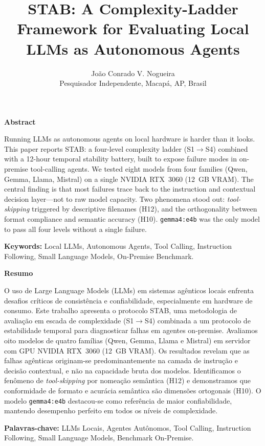 \documentclass{kdmile}
\title{STAB: A Complexity-Ladder Framework for Evaluating Local LLMs as Autonomous Agents}
\author{
  João Conrado V. Nogueira\\
  {\small Pesquisador Independente, Macapá, AP, Brasil}
}
\newenvironment{abstracten}{%
  \vspace{4pt}\begin{center}\normalsize\bfseries Abstract\end{center}%
  \noindent\small\ignorespaces
}{\normalsize\vspace{4pt}}
\newenvironment{resumo}{%
  \vspace{4pt}\begin{center}\normalsize\bfseries Resumo\end{center}%
  \noindent\small\ignorespaces
}{\normalsize\vspace{4pt}}
\begin{document}
\maketitle
\gdef\@runningfoot{\@journalName, KDMiLe 2026.}
\gdef\@firstfoot{\@journalName, KDMiLe 2026.}

\begin{abstracten}
Running LLMs as autonomous agents on local hardware is harder than it looks.
%
This paper reports STAB: a four-level complexity ladder (S1$\rightarrow$S4)
combined with a 12-hour temporal stability battery, built to expose
failure modes in on-premise tool-calling agents.
%
We tested eight models from four families (Qwen, Gemma, Llama, Mistral)
on a single NVIDIA RTX~3060 (12~GB VRAM).
%
The central finding is that most failures trace back to the instruction and
contextual decision layer—\allowbreak not to raw model capacity.
%
Two phenomena stood out: \emph{tool-skipping} triggered by descriptive
filenames (H12), and the orthogonality between format compliance and semantic
accuracy (H10).
%
\texttt{gemma4:e4b} was the only model to pass all four levels without a
single failure.

\textbf{Keywords:} Local LLMs, Autonomous Agents, Tool Calling, Instruction
Following, Small Language Models, On-Premise Benchmark.
\end{abstracten}

\begin{resumo}
O uso de Large Language Models (LLMs) em sistemas agênticos locais enfrenta
desafios críticos de consistência e confiabilidade, especialmente em hardware
de consumo.
%
Este trabalho apresenta o protocolo STAB, uma metodologia de avaliação em escada
de complexidade (S1$\rightarrow$S4) combinada a um protocolo de estabilidade
temporal para diagnosticar falhas em agentes on-premise.
%
Avaliamos oito modelos de quatro famílias (Qwen, Gemma, Llama e Mistral) em
servidor com GPU NVIDIA RTX~3060 (12~GB VRAM).
%
Os resultados revelam que as falhas agênticas originam-se predominantemente na
camada de instrução e decisão contextual, e não na capacidade bruta dos modelos.
%
Identificamos o fenômeno de \emph{tool-skipping} por nomeação semântica (H12) e
demonstramos que conformidade de formato e acurácia semântica são dimensões
ortogonais (H10).
%
O modelo \texttt{gemma4:e4b} destacou-se como referência de maior
confiabilidade, mantendo desempenho perfeito em todos os níveis de complexidade.

\textbf{Palavras-chave:} LLMs Locais, Agentes Autônomos, Tool Calling,
Instruction Following, Small Language Models, Benchmark On-Premise.
\end{resumo}
\end{document}
